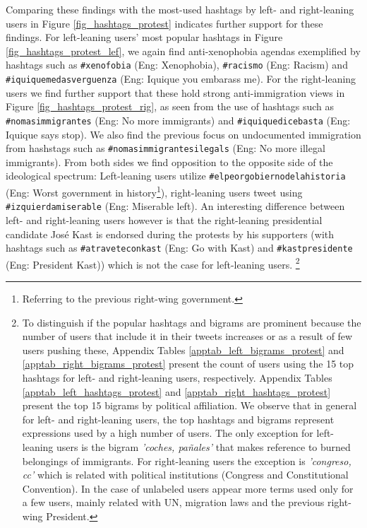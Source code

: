     Comparing these findings with the most-used hashtags by left- and right-leaning users in Figure \ref{fig_hashtags_protest} indicates further support for these findings. For left-leaning users' most popular hashtags in Figure \ref{fig_hashtags_protest_lef}, we again find anti-xenophobia agendas exemplified by hashtags such as \texttt{\#xenofobia} (Eng: Xenophobia), \texttt{\#racismo} (Eng: Racism) and \texttt{\#iquiquemedasverguenza} (Eng: Iquique you embarass me). For the right-leaning users we find further support that these hold strong anti-immigration views in Figure \ref{fig_hashtags_protest_rig}, as seen from the use of hashtags such as \texttt{\#nomasimmigrantes} (Eng: No more immigrants) and \texttt{\#iquiquedicebasta} (Eng: Iquique says stop). We also find the previous focus on undocumented immigration from hashstags such as \texttt{\#nomasimmigrantesilegals} (Eng: No more illegal immigrants). From both sides we find opposition to the opposite side of the ideological spectrum: Left-leaning users utilize \texttt{\#elpeorgobiernodelahistoria} (Eng: Worst government in history\footnote{Referring to the previous right-wing government.}), right-leaning users tweet using \texttt{\#izquierdamiserable} (Eng: Miserable left). An interesting difference between left- and right-leaning users however is that the right-leaning presidential candidate José Kast is endorsed during the protests by his supporters (with hashtags such as \texttt{\#atraveteconkast} (Eng: Go with Kast) and \texttt{\#kastpresidente} (Eng: President Kast)) which is not the case for left-leaning users.%
    \footnote{
    To distinguish if the popular hashtags and bigrams are prominent because the number of users that include it in their tweets increases or as a result of few users pushing these, Appendix Tables \ref{apptab_left_bigrams_protest} and \ref{apptab_right_bigrams_protest} present the count of users using the 15 top hashtags for left- and right-leaning users, respectively. Appendix Tables \ref{apptab_left_hashtags_protest} and \ref{apptab_right_hashtags_protest} present the top 15 bigrams by political affiliation.
    We observe that in general for left- and right-leaning users, the top hashtags and bigrams represent expressions used by a high number of users. The only exception for left-leaning users is the bigram {\it 'coches, pañales'} that makes reference to burned belongings of immigrants. For right-leaning users the exception is {\it 'congreso, cc'} which is related with political institutions (Congress and Constitutional Convention). In the case of unlabeled users appear more terms used only for a few users, mainly related with UN, migration laws and the previous right-wing President.
    }
    
